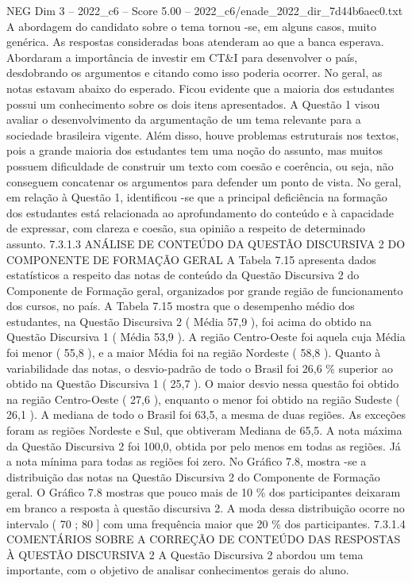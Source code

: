 \begin{textsample}{NEG Dim 3 – 2022\_c6 – Score 5.00 – 2022\_c6/enade\_2022\_dir\_7d44b6aec0.txt}
A abordagem do candidato sobre o tema tornou -se, em alguns casos, muito genérica.
As respostas consideradas boas atenderam ao que a banca esperava.
Abordaram a importância de investir em CT\&I para desenvolver o país, desdobrando os argumentos e citando como isso poderia ocorrer.
No geral, as notas estavam abaixo do esperado.
Ficou evidente que a maioria dos estudantes possui um conhecimento sobre os dois itens apresentados.
A Questão 1 visou avaliar o desenvolvimento da argumentação de um tema relevante para a sociedade brasileira vigente.
Além disso, houve problemas estruturais nos textos, pois a grande maioria dos estudantes tem uma noção do assunto, mas muitos possuem dificuldade de construir um texto com coesão e coerência, ou seja, não conseguem concatenar os argumentos para defender um ponto de vista.
No geral, em relação à Questão 1, identificou -se que a principal deficiência na formação dos estudantes está relacionada ao aprofundamento do conteúdo e à capacidade de expressar, com clareza e coesão, sua opinião a respeito de determinado assunto. 7.3.1.3 ANÁLISE DE CONTEÚDO DA QUESTÃO DISCURSIVA 2 DO COMPONENTE DE FORMAÇÃO GERAL A Tabela 7.15 apresenta dados estatísticos a respeito das notas de conteúdo da Questão Discursiva 2 do Componente de Formação geral, organizados por grande região de funcionamento dos cursos, no país.
A Tabela 7.15 mostra que o desempenho médio dos estudantes, na Questão Discursiva 2 ( Média 57,9 ), foi acima do obtido na Questão Discursiva 1 ( Média 53,9 ).
A região Centro-Oeste foi aquela cuja Média foi menor ( 55,8 ), e a maior Média foi na região Nordeste ( 58,8 ).
Quanto à variabilidade das notas, o desvio-padrão de todo o Brasil foi 26,6 \% superior ao obtido na Questão Discursiva 1 ( 25,7 ).
O maior desvio nessa questão foi obtido na região Centro-Oeste ( 27,6 ), enquanto o menor foi obtido na região Sudeste ( 26,1 ).
A mediana de todo o Brasil foi 63,5, a mesma de duas regiões.
As exceções foram as regiões Nordeste e Sul, que obtiveram Mediana de 65,5.
A nota máxima da Questão Discursiva 2 foi 100,0, obtida por pelo menos em todas as regiões.
Já a nota mínima para todas as regiões foi zero.
No Gráfico 7.8, mostra -se a distribuição das notas na Questão Discursiva 2 do Componente de Formação geral.
O Gráfico 7.8 mostras que pouco mais de 10 \% dos participantes deixaram em branco a resposta à questão discursiva 2.
A moda dessa distribuição ocorre no intervalo ( 70 ; 80 ] com uma frequência maior que 20 \% dos participantes. 7.3.1.4 COMENTÁRIOS SOBRE A CORREÇÃO DE CONTEÚDO DAS RESPOSTAS À QUESTÃO DISCURSIVA 2 A Questão Discursiva 2 abordou um tema importante, com o objetivo de analisar conhecimentos gerais do aluno.

\end{textsample}
